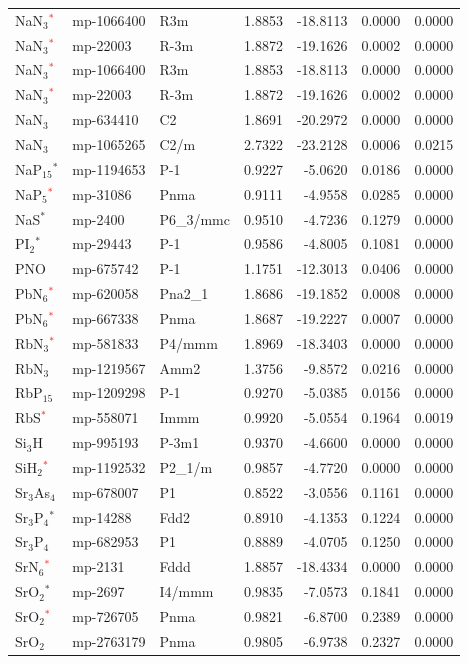 \begin{longtable}{@{}lllrrrr@{}}
NaN$_{3}$\textcolor{red}{$^*$} & mp-1066400 & R3m & 1.8853 & -18.8113 & 0.0000 & 0.0000 \\
NaN$_{3}$\textcolor{red}{$^*$} & mp-22003 & R-3m & 1.8872 & -19.1626 & 0.0002 & 0.0000 \\
NaN$_{3}$\textcolor{red}{$^*$} & mp-1066400 & R3m & 1.8853 & -18.8113 & 0.0000 & 0.0000 \\
NaN$_{3}$\textcolor{red}{$^*$} & mp-22003 & R-3m & 1.8872 & -19.1626 & 0.0002 & 0.0000 \\
NaN$_{3}$ & mp-634410 & C2 & 1.8691 & -20.2972 & 0.0000 & 0.0000 \\
NaN$_{3}$ & mp-1065265 & C2/m & 2.7322 & -23.2128 & 0.0006 & 0.0215 \\
NaP$_{15}$$^*$ & mp-1194653 & P-1 & 0.9227 & -5.0620 & 0.0186 & 0.0000 \\
NaP$_{5}$\textcolor{red}{$^*$} & mp-31086 & Pnma & 0.9111 & -4.9558 & 0.0285 & 0.0000 \\
NaS$^*$ & mp-2400 & P6\_3/mmc & 0.9510 & -4.7236 & 0.1279 & 0.0000 \\
PI$_{2}$$^*$ & mp-29443 & P-1 & 0.9586 & -4.8005 & 0.1081 & 0.0000 \\
PNO & mp-675742 & P-1 & 1.1751 & -12.3013 & 0.0406 & 0.0000 \\
PbN$_{6}$\textcolor{red}{$^*$} & mp-620058 & Pna2\_1 & 1.8686 & -19.1852 & 0.0008 & 0.0000 \\
PbN$_{6}$\textcolor{red}{$^*$} & mp-667338 & Pnma & 1.8687 & -19.2227 & 0.0007 & 0.0000 \\
RbN$_{3}$\textcolor{red}{$^*$} & mp-581833 & P4/mmm & 1.8969 & -18.3403 & 0.0000 & 0.0000 \\
RbN$_{3}$ & mp-1219567 & Amm2 & 1.3756 & -9.8572 & 0.0216 & 0.0000 \\
RbP$_{15}$ & mp-1209298 & P-1 & 0.9270 & -5.0385 & 0.0156 & 0.0000 \\
RbS\textcolor{red}{$^*$} & mp-558071 & Immm & 0.9920 & -5.0554 & 0.1964 & 0.0019 \\
Si$_{3}$H & mp-995193 & P-3m1 & 0.9370 & -4.6600 & 0.0000 & 0.0000 \\
SiH$_{2}$\textcolor{red}{$^*$} & mp-1192532 & P2\_1/m & 0.9857 & -4.7720 & 0.0000 & 0.0000 \\
Sr$_{3}$As$_{4}$ & mp-678007 & P1 & 0.8522 & -3.0556 & 0.1161 & 0.0000 \\
Sr$_{3}$P$_{4}$$^*$ & mp-14288 & Fdd2 & 0.8910 & -4.1353 & 0.1224 & 0.0000 \\
Sr$_{3}$P$_{4}$ & mp-682953 & P1 & 0.8889 & -4.0705 & 0.1250 & 0.0000 \\
SrN$_{6}$\textcolor{red}{$^*$} & mp-2131 & Fddd & 1.8857 & -18.4334 & 0.0000 & 0.0000 \\
SrO$_{2}$$^*$ & mp-2697 & I4/mmm & 0.9835 & -7.0573 & 0.1841 & 0.0000 \\
SrO$_{2}$\textcolor{red}{$^*$} & mp-726705 & Pnma & 0.9821 & -6.8700 & 0.2389 & 0.0000 \\
SrO$_{2}$ & mp-2763179 & Pnma & 0.9805 & -6.9738 & 0.2327 & 0.0000 \\
\end{longtable}
